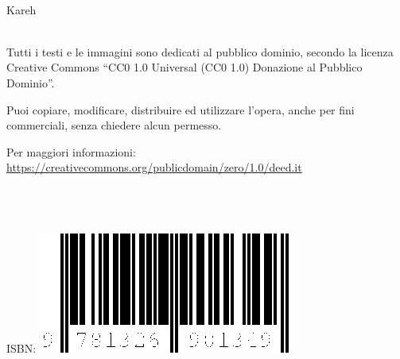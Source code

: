 

\leavevmode\\
\textcopyright Kareh \\
\leavevmode\\

\vfill

Tutti i testi e le immagini sono dedicati al pubblico dominio, secondo la licenza Creative Commons ``CC0 1.0 Universal (CC0 1.0) Donazione al Pubblico Dominio''.

Puoi copiare, modificare, distribuire ed utilizzare l'opera, anche per fini commerciali, senza chiedere alcun permesso.

Per maggiori informazioni: \url{https://creativecommons.org/publicdomain/zero/1.0/deed.it}

\leavevmode\\
\leavevmode\\
\leavevmode\\

ISBN: \includegraphics{lulu/isbn/978-1-326-90134-9-320px.png}
